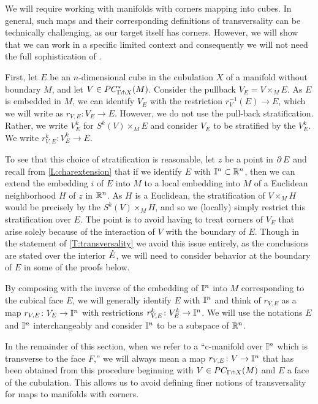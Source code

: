 We will require working with manifolds with corners mapping into cubes.
In general, such maps and their corresponding definitions of transversality can be technically challenging, as our target itself has corners.
However, we will show that we can work in a specific limited context and consequently we will not need the full sophistication of \cite{Joy12}.

First, let $E$ be an $n$-dimensional cube in the cubulation $X$ of a manifold without boundary $M$, and let $V \in PC_{\Gamma \pitchfork X}^*(M)$.
Consider the pullback $V_E = V \times_M E$.
As $E$ is embedded in $M$, we can identify $V_E$ with the restriction $r_V^{-1}(E) \to E$, which we will write as $r_{V,E} \colon V_E \to E$.
However, we do not use the pull-back stratification.
Rather, we write $V_E^k$ for $S^k(V) \times_M E$ and consider $V_E$ to be stratified by the $V_E^k$.
We write $r_{V,E}^k \colon V_E^k \to E$.

To see that this choice of stratification is reasonable, let $z$ be a point in $\operatorname{\partial} E$ and recall from \cref{L:charextension} that if we identify $E$ with $\mathbb{I}^n \subset \mathbb{R}^n$, then we can extend the embedding $i$ of $E$ into $M$ to a local embedding into $M$ of a Euclidean neighborhood $H$ of $z$ in $\mathbb{R}^n$.
As $H$ is a Euclidean, the stratification of $V \times_M H$ would be precisely by the $S^k(V) \times_M H$, and so we (locally) simply restrict this stratification over $E$.
The point is to avoid having to treat corners of $V_E$ that arise solely because of the interaction of $V$ with the boundary of $E$.
Though in the statement of \cref{T:transversality} we avoid this issue entirely, as the conclusions are stated over the interior $\mathring{E}$, we will need to consider behavior at the boundary of $E$ in some of the proofs below.

By composing with the inverse of the embedding of $\mathbb{I}^n$ into $M$ corresponding to the cubical face $E$, we will generally identify $E$ with $\mathbb{I}^n$ and think of $r_{V,E}$ as a map $r_{V,E} \colon V_E \to \mathbb{I}^n$ with restrictions $r_{V,E}^k \colon V_E^k \to \mathbb{I}^n$.
We will use the notations $E$ and $\mathbb{I}^n$ interchangeably and consider $\mathbb{I}^n$ to be a subspace of $\mathbb{R}^n$.

In the remainder of this section, when we refer to a ``c-manifold over $\mathbb{I}^n$ which is transverse to the face $F$,'' we will always mean a map $r_{V,E} \colon V \to \mathbb{I}^n$ that has been obtained from this procedure beginning with $V \in PC_{\Gamma \pitchfork X}(M)$ and $E$ a face of the cubulation.
This allows us to avoid defining finer notions of transversality for maps to manifolds with corners.

